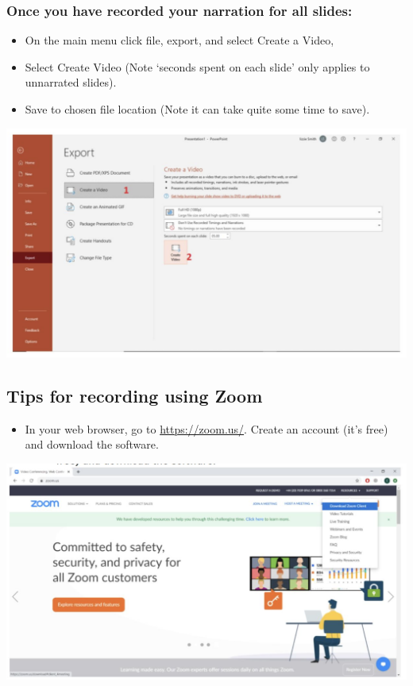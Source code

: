 \documentclass[
  12pt,
]{book}
\providecommand{\tightlist}{%
  \setlength{\itemsep}{0pt}\setlength{\parskip}{0pt}}
\begin{document}
\hypertarget{once-you-have-recorded-your-narration-for-all-slides}{%
\subsubsection{Once you have recorded your narration for all slides:}\label{once-you-have-recorded-your-narration-for-all-slides}}

\begin{itemize}
\item
  On the main menu click file, export, and select Create a Video,
\item
  Select Create Video (Note `seconds spent on each slide' only applies to unnarrated slides).
\item
  Save to chosen file location (Note it can take quite some time to save).
\end{itemize}

\includegraphics{powerpoint3.png}

\hypertarget{tips-for-recording-using-zoom}{%
\subsection{Tips for recording using Zoom}\label{tips-for-recording-using-zoom}}

\begin{itemize}
\tightlist
\item
  In your web browser, go to \url{https://zoom.us/}. Create an account (it's free) and download the software.
\end{itemize}

\includegraphics{zoom1.png}
\end{document}
